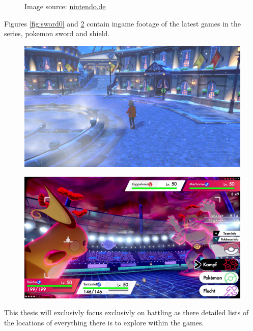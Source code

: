 \documentclass{article}
\begin{document}
\begin{figure}[ht]
\begin{minipage}{.5\textwidth}
      \label{fig:red1}
    \end{minipage}
    \caption*{Image source: \href{https://www.nintendo.de/Spiele/Game-Boy/Pokemon-Rote-Edition-266109.html}{nintendo.de}}
\end{figure}
Figures \ref{fig:sword0} and \ref{fig:sword1} contain ingame footage of the latest games in
the series, pokemon sword and shield.
\begin{figure}
  \centering
  \begin{minipage}{.48\textwidth}
    \centering
    \includegraphics[width=.9\linewidth]{images/Sword-0.jpg}
    \label{fig:sword0}
  \end{minipage}%
  \begin{minipage}{.48\textwidth}
    \centering
    \includegraphics[width=.9\linewidth]{images/Sword-1.jpg}
    \label{fig:sword1}
  \end{minipage}
\end{figure}
This thesis will exclusivly focus exclusivly on battling as there detailed lists
of the locations of everything there is to explore within the games.
\end{document}
